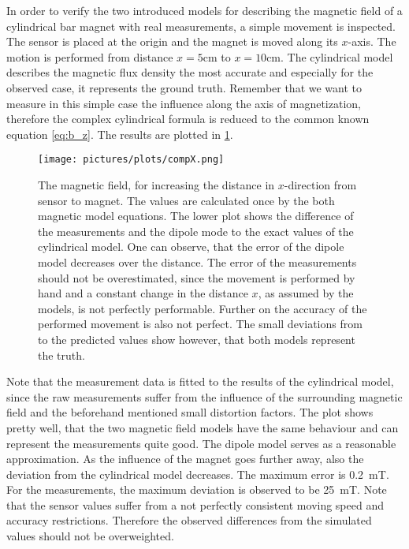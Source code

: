 In order to verify the two introduced models for describing the magnetic field of a cylindrical bar magnet with real measurements, a simple movement is inspected. The sensor is placed at the origin and the magnet is moved along its $ x $-axis. The motion is performed from distance $ x=5\si{\cm} $ to $ x=10\si{\cm} $. The cylindrical model describes the magnetic flux density the most accurate and especially for the observed case, it represents the ground truth. Remember that we want to measure in this simple case the influence along the axis of magnetization, therefore the complex cylindrical formula is reduced to the common known equation \ref{eq:b_z}. The results are plotted in \ref{fig:modCompFlat}.
\begin{figure}[!htb]
\centering
\texttt{[image: pictures/plots/compX.png]}
\caption[Comparing the models and sensor measurements for flat movement]
{The magnetic field, for increasing the distance in $ x $-direction from sensor to magnet. The values are calculated once by the both magnetic model equations. The lower plot shows the difference of the measurements and the dipole mode to the exact values of the cylindrical model. One can observe, that the error of the dipole model decreases over the distance. The error of the measurements should not be overestimated, since the movement is performed by hand and a constant change in the distance $ x $, as assumed by the models, is not perfectly performable. Further on the accuracy of the performed movement is also not perfect. The small deviations from to the predicted values show however, that both models represent the truth.}
\label{fig:modCompFlat}
\end{figure}
Note that the measurement data is fitted to the results of the cylindrical model, since the raw measurements suffer from the influence of the surrounding magnetic field and the beforehand mentioned small distortion factors. The plot shows pretty well, that the two magnetic field models have the same behaviour and can represent the measurements quite good. The dipole model serves as a reasonable approximation. As the influence of the magnet goes further away, also the deviation from the cylindrical model decreases. The maximum error is \SI{0.2}{\milli \tesla}. For the measurements, the maximum deviation is observed to be \SI{25}{\milli \tesla}. Note that the sensor values suffer from a not perfectly consistent moving speed and accuracy restrictions. Therefore the observed differences from the simulated values should not be overweighted.

